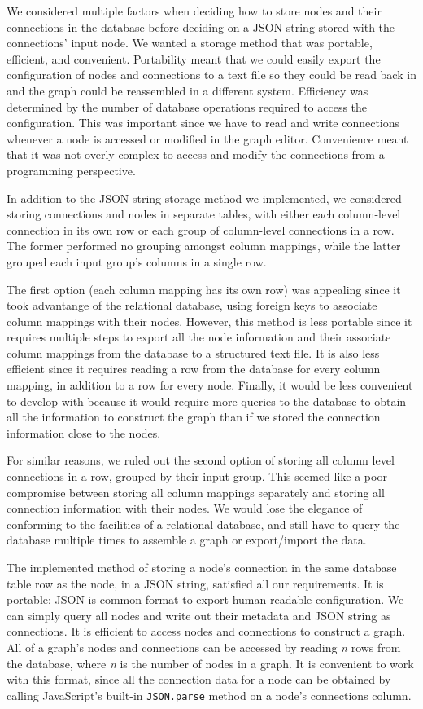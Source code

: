 \documentclass[midd]{thesis}
\begin{document}
We considered multiple factors when deciding how to store nodes and their
connections in the database before deciding on a JSON string stored with the
connections' input node. We wanted a storage method that was portable,
efficient, and convenient. Portability meant that we could easily export the
configuration of nodes and connections to a text file so they could be read back
in and the graph could be reassembled in a different system. Efficiency was
determined by the number of database operations required to access the
configuration. This was important since we have to read and write connections
whenever a node is accessed or modified in the graph editor. Convenience meant
that it was not overly complex to access and modify the connections from a
programming perspective.

In addition to the JSON string storage method we implemented, we considered
storing connections and nodes in separate tables, with either each column-level
connection in its own row or each group of column-level connections in a row.
The former performed no grouping amongst column mappings, while the latter
grouped each input group's columns in a single row.

The first option (each column mapping has its own row) was appealing since it
took advantange of the relational database, using foreign keys to associate
column mappings with their nodes. However, this method is less portable since it
requires multiple steps to export all the node information and their associate
column mappings from the database to a structured text file. It is also less
efficient since it requires reading a row from the database for every column
mapping, in addition to a row for every node. Finally, it would be less
convenient to develop with because it would require more queries to the database
to obtain all the information to construct the graph than if we stored the
connection information close to the nodes.

For similar reasons, we ruled out the second option of storing all column level
connections in a row, grouped by their input group. This seemed like a poor
compromise between storing all column mappings separately and storing all
connection information with their nodes. We would lose the elegance of
conforming to the facilities of a relational database, and still have to query
the database multiple times to assemble a graph or export/import the data.

The implemented method of storing a node's connection in the same database table
row as the node, in a JSON string, satisfied all our requirements. It is
portable: JSON is common format to export human readable configuration. We can
simply query all nodes and write out their metadata and JSON string as
connections. It is efficient to access nodes and connections to construct a
graph. All of a graph's nodes and connections can be accessed by reading
\textit{n} rows from the database, where \textit{n} is the number of nodes in a
graph. It is convenient to work with this format, since all the connection data
for a node can be obtained by calling JavaScript's built-in \texttt{JSON.parse}
method on a node's connections column.
\end{document}
